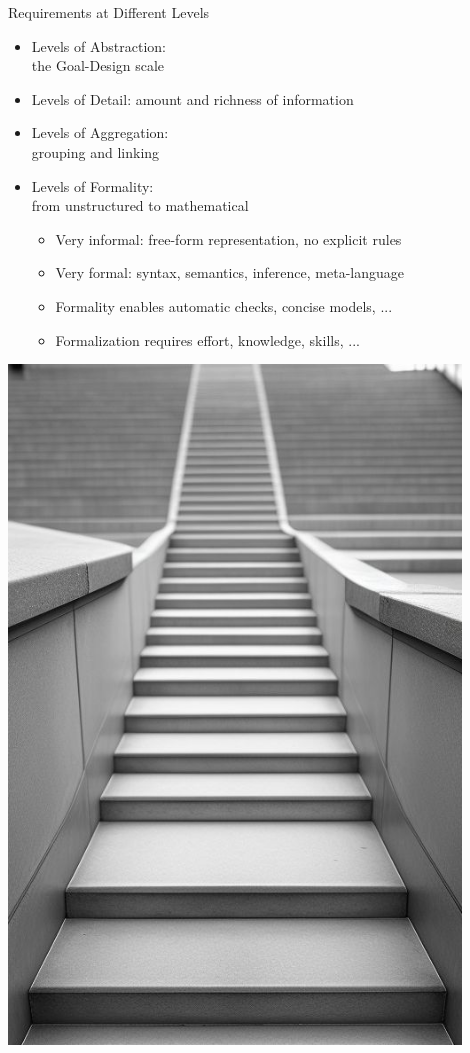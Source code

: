 \documentclass{beamer}
\begin{document}
\begin{frame}[fragile]{Requirements at Different Levels}
\begin{minipage}[t]{0.7\textwidth}
\vspace{0pt}
\begin{itemize}
\item Levels of Abstraction:\\the Goal-Design scale 
\item Levels of Detail: amount and richness of information 
\item Levels of Aggregation:\\grouping and linking 
\item Levels of Formality:\\from unstructured to mathematical
\begin{itemize}
\item Very informal: free-form representation, no explicit rules
\item Very formal: syntax, semantics, inference, meta-language
\item Formality enables automatic checks, concise models, ...
\item Formalization requires effort, knowledge, skills, ...
\end{itemize}
\end{itemize}
\end{minipage}%
\begin{minipage}[t]{0.35\textwidth}
\vspace{0pt}
\hfill\includegraphics[width=0.9\textwidth]{img/stairs1}
\end{minipage}%
\end{frame}
\end{document}
